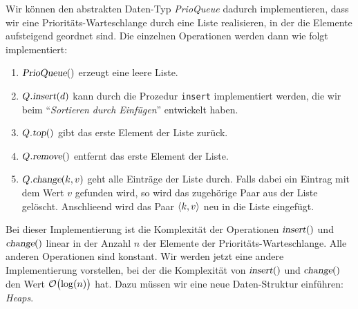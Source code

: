 Wir k\"onnen den abstrakten Daten-Typ \textsl{PrioQueue} dadurch implementieren,
dass wir eine Priorit\"ats-Warteschlange durch eine Liste realisieren, in der die Elemente
aufsteigend geordnet sind. Die einzelnen Operationen werden dann wie folgt implementiert:
\begin{enumerate}
\item $\textsl{PrioQueue}()$ erzeugt eine leere Liste.
\item $Q.\textsl{insert}(d)$ kann durch die Prozedur \texttt{insert} implementiert werden,
      die wir beim ``\emph{Sortieren durch Einf\"ugen}'' entwickelt haben.
\item $Q.\textsl{top}()$ gibt das erste Element der Liste zur\"uck.
\item $Q.\textsl{remove}()$ entfernt das erste Element der Liste.
\item $Q.\textsl{change}(k,v)$ geht alle Eintr\"age der Liste durch.
      Falls dabei ein Eintrag mit dem Wert $v$ gefunden wird, so wird das zugeh\"orige
      Paar aus der Liste gel\"oscht.  Anschlie\3end wird das Paar $\pair(k,v)$ neu in die
      Liste eingef\"ugt.
\end{enumerate}
Bei dieser Implementierung ist die Komplexit\"at der Operationen $\textsl{insert}()$ und
$\textsl{change}()$ linear in der
Anzahl $n$ der Elemente der Priorit\"ats-Warteschlange.  Alle anderen Operationen sind
konstant. Wir werden jetzt eine andere
Implementierung vorstellen, bei der die Komplexit\"at von $\textsl{insert}()$ und
$\textsl{change}()$ den Wert $\mathcal{O}\bigl(\log(n)\bigr)$ hat.  Dazu m\"ussen wir eine neue Daten-Struktur einf\"uhren: \emph{Heaps}.

